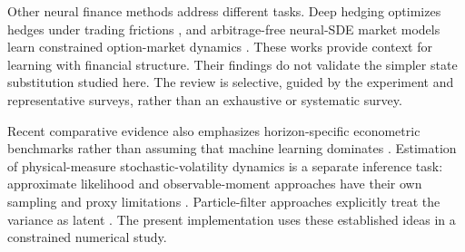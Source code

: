 Other neural finance methods address different tasks. Deep hedging optimizes hedges under trading frictions \cite{buehler}, and arbitrage-free neural-SDE market models learn constrained option-market dynamics \cite{cohen}. These works provide context for learning with financial structure. Their findings do not validate the simpler state substitution studied here. The review is selective, guided by the experiment and representative surveys, rather than an exhaustive or systematic survey.


Recent comparative evidence also emphasizes horizon-specific econometric benchmarks rather than assuming that machine learning dominates \cite{kilic}. Estimation of physical-measure stochastic-volatility dynamics is a separate inference task: approximate likelihood and observable-moment approaches have their own sampling and proxy limitations \cite{azencott,azencottrealized}. Particle-filter approaches explicitly treat the variance as latent \cite{arulampalam,gruszka}. The present implementation uses these established ideas in a constrained numerical study.
